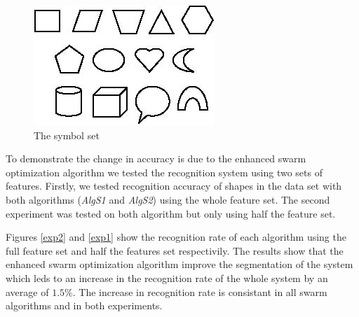\documentclass[10pt]{article}
\begin{document}
 \begin{figure}
  \centering 
 
		\includegraphics[scale=0.5]{symbolSet.PNG} 
		\caption[The Symbol Set] {The symbol set}   \label{fig:symbolSet}
	 \end{figure}
To demonstrate the change in accuracy is due to the enhanced swarm optimization algorithm we tested the recognition system using two sets of features. Firstly, we tested recognition accuracy of shapes in the data set with both algorithms (\textsl{AlgS1} and \textsl{AlgS2}) using the whole feature set. The second experiment was tested on both algorithm but only using half the feature set. 

Figures \ref{exp2} and \ref{exp1} show the recognition rate of each algorithm using the full feature set and half the features set respectivily. The results show that the enhanced swarm optimization algorithm improve the segmentation of the system which leds to an increase in the recognition rate of the whole system by an average of $1.5\%$.  The increase in recognition rate is consistant in all swarm algorithms and in both experiments.    %
	 
\end{document}
